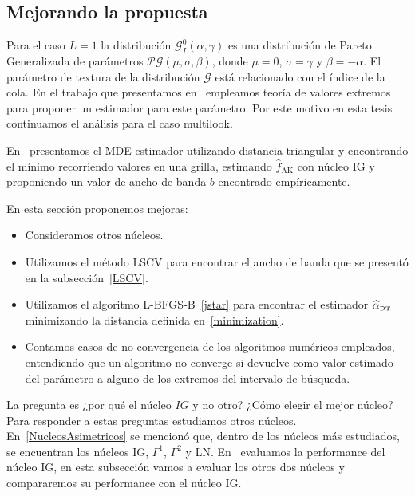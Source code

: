 \subsection{Mejorando la propuesta}
\label{mejorando}

Para el caso $L=1$ la distribución $\mathcal{G}_I^0(\alpha,\gamma)$ es una distribución de Pareto Generalizada de parámetros $\mathcal{PG}(\mu,\sigma,\beta)$, donde $\mu=0$, $\sigma=\gamma$ y $\beta=-\alpha$. El parámetro de textura de la distribución $\mathcal{G}$ está relacionado con el índice de la cola. En el trabajo que presentamos en~\cite{Chan2016} empleamos teoría de valores extremos para proponer un estimador para este parámetro. Por este motivo en esta tesis continuamos el análisis para el caso multilook.

En~\cite{gambini2015} presentamos el MDE estimador utilizando distancia triangular y encontrando el mínimo recorriendo valores en una grilla, estimando $\widehat{f}_{\text{AK}}$ con núcleo IG y proponiendo un valor de ancho de banda $b$ encontrado empíricamente.

En esta sección proponemos mejoras:

\begin{itemize}
	\item Consideramos otros núcleos.%
	\item Utilizamos el método LSCV para encontrar el ancho de banda que se presentó en la subsección~\ref{LSCV}.
	\item Utilizamos el algoritmo L-BFGS-B~\ref{jstar} para encontrar el estimador $\widehat{\alpha}_{\text{\tiny{DT}}}$ minimizando la distancia definida en~\ref{minimization}.
	\item Contamos casos de no convergencia de los algoritmos numéricos empleados, entendiendo que un algoritmo no converge si devuelve como valor estimado del parámetro a alguno de los extremos del intervalo de búsqueda.
\end{itemize}  

La pregunta es ¿por qué el núcleo $IG$ y no otro? ¿Cómo elegir el mejor núcleo? Para responder a estas preguntas estudiamos otros núcleos. En~\ref{NucleosAsimetricos} se mencionó que, dentro de los núcleos más estudiados, se encuentran los núcleos IG, $\Gamma^1$, $\Gamma^2$ y LN. En~\cite{gambini2015} evaluamos la performance del núcleo IG, en esta subsección vamos a evaluar los otros dos núcleos y compararemos su performance con el núcleo IG. 

